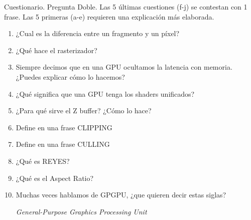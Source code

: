 
\begin{pregunta}{Cuestionario. Pregunta Doble. Las 5 últimas cuestiones (f-j) se contestan con 1 frase. Las 5
primeras (a-e) requieren una explicación más elaborada.}

\begin{enumerate}[label=(\alph*)]
    \item ¿Cual es la diferencia entre un fragmento y un píxel?
    \item ¿Qué hace el rasterizador?
    \item Siempre decimos que en una GPU ocultamos la latencia con memoria. ¿Puedes explicar cómo lo hacemos?
    \item ¿Qué significa que una GPU tenga los shaders unificados?
    \item ¿Para qué sirve el Z buffer? ¿Cómo lo hace?
    \item Define en una frase CLIPPING
    \item Define en una frase CULLING
    \item ¿Qué es REYES?
    \item ¿Qué es el Aspect Ratio?
    \item Muchas veces hablamos de GPGPU, ¿que quieren decir estas siglas?

    \emph{General-Purpose Graphics Processing Unit}

\end{enumerate}

\end{pregunta}
